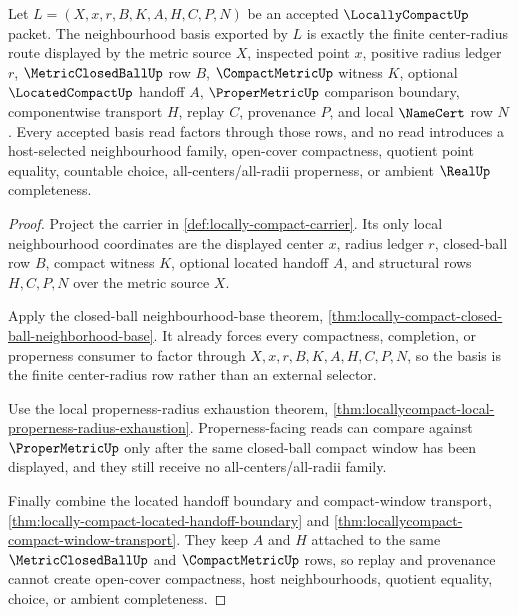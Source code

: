 \begin{theorem}
\label{thm:locallycompact-compact-neighbourhood-basis}
Let $L=(X,x,r,B,K,A,H,C,P,N)$ be an accepted $\LocallyCompactUp$ packet. The neighbourhood basis exported by $L$ is exactly the finite center-radius route displayed by the metric source $X$, inspected point $x$, positive radius ledger $r$, $\MetricClosedBallUp$ row $B$, $\CompactMetricUp$ witness $K$, optional $\LocatedCompactUp$ handoff $A$, $\ProperMetricUp$ comparison boundary, componentwise transport $H$, replay $C$, provenance $P$, and local $\NameCert$ row $N$. Every accepted basis read factors through those rows, and no read introduces a host-selected neighbourhood family, open-cover compactness, quotient point equality, countable choice, all-centers/all-radii properness, or ambient $\RealUp$ completeness.
\end{theorem}
\begin{proof}
Project the carrier in \autoref{def:locally-compact-carrier}. Its only local neighbourhood coordinates are the displayed center $x$, radius ledger $r$, closed-ball row $B$, compact witness $K$, optional located handoff $A$, and structural rows $H,C,P,N$ over the metric source $X$.

Apply the closed-ball neighbourhood-base theorem, \autoref{thm:locally-compact-closed-ball-neighborhood-base}. It already forces every compactness, completion, or properness consumer to factor through $X,x,r,B,K,A,H,C,P,N$, so the basis is the finite center-radius row rather than an external selector.

Use the local properness-radius exhaustion theorem, \autoref{thm:locallycompact-local-properness-radius-exhaustion}. Properness-facing reads can compare against $\ProperMetricUp$ only after the same closed-ball compact window has been displayed, and they still receive no all-centers/all-radii family.

Finally combine the located handoff boundary and compact-window transport, \autoref{thm:locally-compact-located-handoff-boundary} and \autoref{thm:locallycompact-compact-window-transport}. They keep $A$ and $H$ attached to the same $\MetricClosedBallUp$ and $\CompactMetricUp$ rows, so replay and provenance cannot create open-cover compactness, host neighbourhoods, quotient equality, choice, or ambient completeness.
\end{proof}

